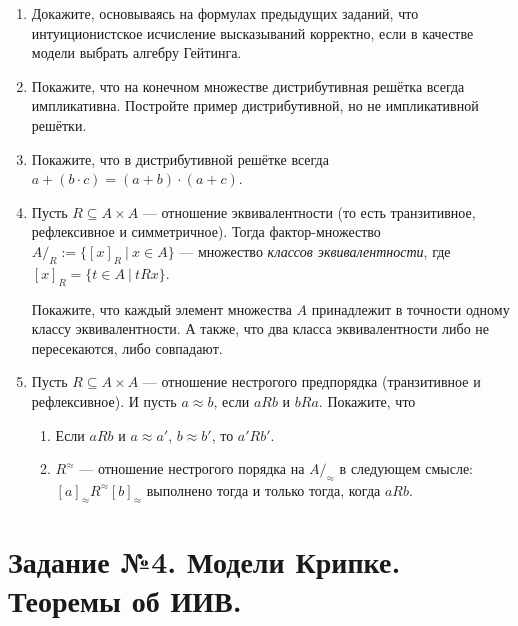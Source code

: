 \documentclass[10pt,a4paper,oneside]{article}
\begin{document}
\begin{enumerate}
\item Докажите, основываясь на формулах предыдущих заданий, что интуиционистское исчисление высказываний
корректно, если в качестве модели выбрать алгебру Гейтинга.

\item Покажите, что на конечном множестве дистрибутивная решётка всегда импликативна. Постройте пример дистрибутивной, но не импликативной решётки.
\item Покажите, что в дистрибутивной решётке всегда $a + (b \cdot c) = (a + b) \cdot (a + c)$.

\item Пусть $R \subseteq A\times A$ --- отношение эквивалентности (то есть транзитивное, рефлексивное и симметричное).
Тогда фактор-множество $A/_R := \{ [ x ]_R\ |\ x \in A\}$ --- множество \emph{классов эквивалентности},
где $[x]_R = \{ t\in A\ |\ tRx\}$.

Покажите, что каждый элемент множества $A$ принадлежит в точности одному классу эквивалентности. А также, что два класса эквивалентности либо не пересекаются, либо совпадают.

\item Пусть $R \subseteq A\times A$ --- отношение нестрогого предпорядка (транзитивное и рефлексивное). И пусть
$a \approx b$, если $aRb$ и $bRa$. Покажите, что 
\begin{enumerate}
\item Если $aRb$ и $a \approx a'$, $b \approx b'$, то $a'Rb'$.
\item $R^\approx$ --- отношение нестрогого порядка на $A/_\approx$ в следующем смысле: $[a]_\approx R^\approx [b]_\approx$ выполнено тогда и только тогда,
когда $aRb$.
\end{enumerate}
\end{enumerate}

\section*{Задание №4. Модели Крипке. Теоремы об ИИВ.}
\end{document}
